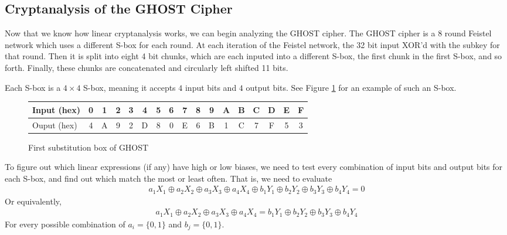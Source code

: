 \documentclass[12pt, a4paper, final]{report}
\begin{document}
\subsection{Cryptanalysis of the GHOST Cipher}

Now that we know how linear cryptanalysis works, we can begin analyzing the
GHOST cipher. The GHOST cipher is a 8 round Feistel network which uses a
different S-box for each round. At each iteration of the Feistel network, the
32 bit input XOR'd with the subkey for that round. Then it is split into eight
4 bit chunks, which are each inputed into a different S-box, the first chunk in
the first S-box, and so forth. Finally, these chunks are concatenated and
circularly left shifted 11 bits.

Each S-box is a $4 \times 4$ S-box, meaning it accepts $4$ input bits and $4$
output bits. See Figure \ref{fig:sbox} for an example of such an S-box.
\begin{figure}[h]
\begin{center}
\begin{tabular}{l*{16}{c}}
\toprule
Input (hex) & 0 & 1 & 2 & 3 & 4 & 5 & 6 & 7 & 8 & 9 & A & B & C & D & E & F\\
\midrule
Ouput (hex) & 4 & A & 9 & 2 & D & 8 & 0 & E & 6 & B & 1 & C & 7 & F & 5 & 3\\
\bottomrule
\end{tabular}
\end{center}
\caption{First substitution box of GHOST}
\label{fig:sbox}
\end{figure}

To figure out which linear expressions (if any) have high or low biases, we need
to test every combination of input bits and output bits for each S-box, and
find out which match the most or least often. That is, we need to evaluate
\begin{align*}
    a_1X_1 \oplus a_2X_2 \oplus a_3X_3 \oplus a_4X_4 \oplus
    b_1Y_1 \oplus b_2Y_2 \oplus b_3Y_3 \oplus b_4Y_4 = 0
\end{align*}
Or equivalently,
\begin{align*}
    a_1X_1 \oplus a_2X_2 \oplus a_3X_3 \oplus a_4X_4 =
    b_1Y_1 \oplus b_2Y_2 \oplus b_3Y_3 \oplus b_4Y_4
\end{align*}
For every possible combination of $a_i = \{0, 1\}$ and $b_j = \{0, 1\}$.
\end{document}
